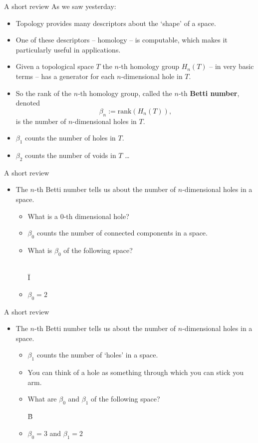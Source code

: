 \begin{frame}{A short review}
As we saw yesterday:
\begin{itemize}
\item Topology provides many descriptors about the `shape' of a space.
\item One of these descriptors -- homology -- is computable, which makes it particularly useful in applications.
\item Given a topological space $T$ the $n$-th homology group $H_n(T)$ -- in very basic terms -- has a generator for each $n$-dimensional hole in $T$. 
\item So the rank of the $n$-th homology group, called the $n$-th \textbf{Betti number}, denoted
	\[
	\beta_n := \textrm{rank}(H_n(T)),
	\]
is the number of $n$-dimensional holes in $T$.
\item $\beta_1$ counts the number of holes in $T$.
\item $\beta_2$ counts the number of voids in $T$ \ldots
\end{itemize}
\end{frame}
\begin{frame}{A short review}
\begin{itemize}
\item The $n$-th Betti number tells us about the number of $n$-dimensional holes in a space.
	\begin{itemize}
	\item What is a $0$-th dimensional hole?
	\item $\beta_0$ counts the number of connected components in a space.
	\item What is $\beta_0$ of the following space?\\
	\
	\begin{center}
	{\fontsize{50pt}{1pt}\selectfont \={I}}
	\end{center}
	\item<2-> $\beta_0 = 2$
	\end{itemize}
\end{itemize}
\end{frame}
\begin{frame}{A short review}
\begin{itemize}
\item The $n$-th Betti number tells us about the number of $n$-dimensional holes in a space.
	\begin{itemize}
	\item $\beta_1$ counts the number of `holes' in a space.
	\item You can think of a hole as something through which you can stick you arm.
	\item What are $\beta_0$ and $\beta_1$ of the following space?
	\begin{center}
	{\fontsize{50pt}{12pt}\selectfont \"{B}}
	\end{center}	
	\item<2-> $\beta_0 = 3$ and $\beta_1 = 2$
	\end{itemize}
\end{itemize}
\end{frame}
